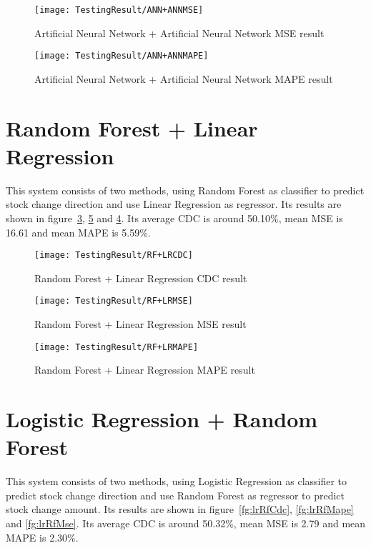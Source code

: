 \begin{figure}[h]
	\centering
	\texttt{[image: TestingResult/ANN+ANNMSE]}
	\caption{Artificial Neural Network + Artificial Neural Network MSE result}
	\label{fg:annAnnMse}
\end{figure}

\begin{figure}[h]
	\centering
	\texttt{[image: TestingResult/ANN+ANNMAPE]}
	\caption{Artificial Neural Network + Artificial Neural Network MAPE result}
	\label{fg:annAnnMape}
\end{figure}

\clearpage


\section{Random Forest + Linear Regression}

This system consists of two methods, using Random Forest as classifier to predict stock change direction and use Linear Regression as regressor. Its results are shown in figure~\ref{fg:rfLrCdc}, \ref{fg:rfLrMape} and \ref{fg:rfLrMse}. Its average CDC is around 50.10\%, mean MSE is 16.61 and mean MAPE is 5.59\%.

\begin{figure}[h]
	\centering
	\texttt{[image: TestingResult/RF+LRCDC]}
	\caption{Random Forest + Linear Regression CDC result}
	\label{fg:rfLrCdc}
\end{figure}

\begin{figure}[h]
	\centering
	\texttt{[image: TestingResult/RF+LRMSE]}
	\caption{Random Forest + Linear Regression MSE result}
	\label{fg:rfLrMse}
\end{figure}

\begin{figure}[h]
	\centering
	\texttt{[image: TestingResult/RF+LRMAPE]}
	\caption{Random Forest + Linear Regression MAPE result}
	\label{fg:rfLrMape}
\end{figure}

\clearpage

\section{Logistic Regression + Random Forest}

This system consists of two methods, using Logistic Regression as classifier to predict stock change direction and use Random Forest as regressor to predict stock change amount. Its results are shown in figure~\ref{fg:lrRfCdc}, \ref{fg:lrRfMape} and \ref{fg:lrRfMse}. Its average CDC is around 50.32\%, mean MSE is 2.79 and mean MAPE is 2.30\%.

